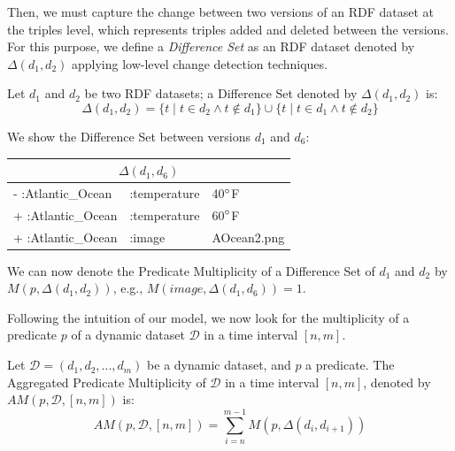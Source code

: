 \documentclass[runningheads]{llncs}
\begin{document}
Then, we must capture the change between two versions of an RDF dataset at the triples level, which represents triples added and deleted between the versions. For this purpose, we define a \textit{Difference Set} as an RDF dataset denoted by $\Delta(d_1, d_2)$ applying low-level change detection techniques.

\begin{definition}
	Let $d_1$ and $d_2$ be two RDF datasets; a Difference Set denoted by $\Delta(d_1, d_2)$ is:
	\begin{equation}
	\label{eq:ds}
	\Delta(d_1, d_2) = \{t \mid t \in d_2 \wedge t \notin d_1\} \cup \{t \mid t \in d_1 \wedge t \notin d_2\}
	\end{equation}
\end{definition}

\begin{example}
	\label{ex:ds}
	We show the Difference Set between versions $d_1$ and $d_6$:\\
	\begin{center}    
		\begin{tabular}{lll}    \hline
			\multicolumn{3}{c}{$\Delta(d_1, d_6)$} \\    \hline
			-    :Atlantic\_Ocean  & :temperature   & 40$\degree$F          \\
			+    :Atlantic\_Ocean  & :temperature   & 60$\degree$F          \\
			+    :Atlantic\_Ocean  & :image         & AOcean2.png              \\    \hline
		\end{tabular}
	\end{center}
	
	We can now denote the Predicate Multiplicity of a Difference Set of $d_1$ and $d_2$ by $M(p, \Delta(d_1, d_2))$, e.g., $M(image, \Delta(d_1, d_6)) = 1$.
\end{example}


Following the intuition of our model, we now look for the multiplicity of a predicate $p$ of a dynamic dataset $\mathcal{D}$ in a time interval $[n,m]$.

\begin{definition}
	Let $\mathcal{D} = (d_1, d_2, ..., d_m)$ be a dynamic dataset, and $p$ a predicate. The Aggregated Predicate Multiplicity of $\mathcal{D}$ in a time interval $[n,m]$, denoted by $AM(p, \mathcal{D},[n,m])$ is:
	\begin{equation}
	\label{eq:apm}
	AM(p, \mathcal{D},[n,m]) = \sum_{i=n}^{m-1}M(p, \Delta(d_i, d_{i+1}))
	\end{equation}
\end{definition}
\end{document}
